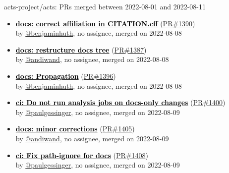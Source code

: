 \begin{frame}[allowframebreaks]{ acts-project/acts: PRs merged 
between 2022-08-01 and 2022-08-11
}
\begin{itemize}
    \item\prmerged
    \hspace*{0.1em}
    \textbf{\href{https://github.com/acts-project/acts/pull/1390}{\textcolor{black}{docs: correct affiliation in CITATION.cff}}}
    (\href{https://github.com/acts-project/acts/pull/1390}{PR\#1390}) \\
    by \href{https://github.com/benjaminhuth}{@benjaminhuth}, {}no assignee, merged on 2022-08-08

    \item\prmerged\prwip
    \hspace*{0.1em}
    \textbf{\href{https://github.com/acts-project/acts/pull/1387}{\textcolor{black}{docs: restructure docs tree}}}
    (\href{https://github.com/acts-project/acts/pull/1387}{PR\#1387}) \\
    by \href{https://github.com/andiwand}{@andiwand}, {}no assignee, merged on 2022-08-08

    \item\prmerged
    \hspace*{0.1em}
    \textbf{\href{https://github.com/acts-project/acts/pull/1396}{\textcolor{black}{docs: Propagation}}}
    (\href{https://github.com/acts-project/acts/pull/1396}{PR\#1396}) \\
    by \href{https://github.com/benjaminhuth}{@benjaminhuth}, {}no assignee, merged on 2022-08-08

    \item\prmerged
    \hspace*{0.1em}
    \textbf{\href{https://github.com/acts-project/acts/pull/1400}{\textcolor{black}{ci: Do not run analysis jobs on docs-only changes}}}
    (\href{https://github.com/acts-project/acts/pull/1400}{PR\#1400}) \\
    by \href{https://github.com/paulgessinger}{@paulgessinger}, {}no assignee, merged on 2022-08-09

    \item\prmerged
    \hspace*{0.1em}
    \textbf{\href{https://github.com/acts-project/acts/pull/1405}{\textcolor{black}{docs: minor corrections}}}
    (\href{https://github.com/acts-project/acts/pull/1405}{PR\#1405}) \\
    by \href{https://github.com/andiwand}{@andiwand}, {}no assignee, merged on 2022-08-09

    \item\prmerged
    \hspace*{0.1em}
    \textbf{\href{https://github.com/acts-project/acts/pull/1408}{\textcolor{black}{ci: Fix path-ignore for docs}}}
    (\href{https://github.com/acts-project/acts/pull/1408}{PR\#1408}) \\
    by \href{https://github.com/paulgessinger}{@paulgessinger}, {}no assignee, merged on 2022-08-09


\end{itemize}
\end{frame}

